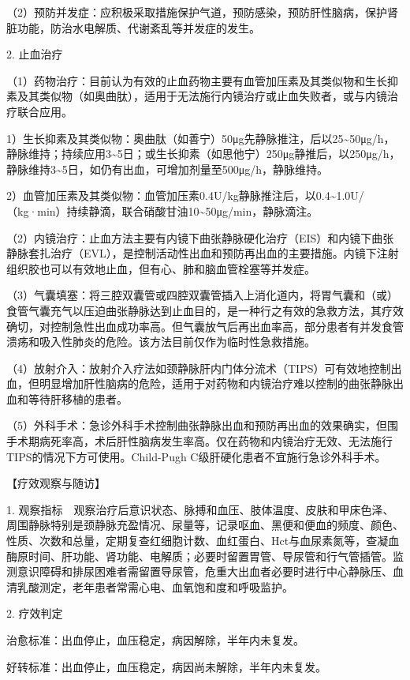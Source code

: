 （2）预防并发症：应积极采取措施保护气道，预防感染，预防肝性脑病，保护肾脏功能，防治水电解质、代谢紊乱等并发症的发生。

2. 止血治疗

（1）药物治疗：目前认为有效的止血药物主要有血管加压素及其类似物和生长抑素及其类似物（如奥曲肽），适用于无法施行内镜治疗或止血失败者，或与内镜治疗联合应用。

1）生长抑素及其类似物：奥曲肽（如善宁）50μg先静脉推注，后以25\textasciitilde{}50μg/h，静脉维持；持续应用3\textasciitilde{}5日；或生长抑素（如思他宁）250μg静推后，以250μg/h，静脉维持3\textasciitilde{}5日，如仍有出血，可增加剂量至500μg/h，静脉维持。

2）血管加压素及其类似物：血管加压素0.4U/kg静脉推注后，以0.4\textasciitilde{}1.0U/（kg·min）持续静滴，联合硝酸甘油10\textasciitilde{}50μg/min，静脉滴注。

（2）内镜治疗：止血方法主要有内镜下曲张静脉硬化治疗（EIS）和内镜下曲张静脉套扎治疗（EVL），是控制活动性出血和预防再出血的主要措施。内镜下注射组织胶也可以有效地止血，但有心、肺和脑血管栓塞等并发症。

（3）气囊填塞：将三腔双囊管或四腔双囊管插入上消化道内，将胃气囊和（或）食管气囊充气以压迫曲张静脉达到止血目的，是一种行之有效的急救方法，其疗效确切，对控制急性出血成功率高。但气囊放气后再出血率高，部分患者有并发食管溃疡和吸入性肺炎的危险。该方法目前仅作为临时性急救措施。

（4）放射介入：放射介入疗法如颈静脉肝内门体分流术（TIPS）可有效地控制出血，但明显增加肝性脑病的危险，适用于对药物和内镜治疗难以控制的曲张静脉出血和等待肝移植的患者。

（5）外科手术：急诊外科手术控制曲张静脉出血和预防再出血的效果确实，但围手术期病死率高，术后肝性脑病发生率高。仅在药物和内镜治疗无效、无法施行TIPS的情况下方可使用。Child-Pugh
C级肝硬化患者不宜施行急诊外科手术。

【疗效观察与随访】

1.
观察指标　观察治疗后意识状态、脉搏和血压、肢体温度、皮肤和甲床色泽、周围静脉特别是颈静脉充盈情况、尿量等，记录呕血、黑便和便血的频度、颜色、性质、次数和总量，定期复查红细胞计数、血红蛋白、Hct与血尿素氮等，查凝血酶原时间、肝功能、肾功能、电解质；必要时留置胃管、导尿管和行气管插管。监测意识障碍和排尿困难者需留置导尿管，危重大出血者必要时进行中心静脉压、血清乳酸测定，老年患者常需心电、血氧饱和度和呼吸监护。

2. 疗效判定

治愈标准：出血停止，血压稳定，病因解除，半年内未复发。

好转标准：出血停止，血压稳定，病因尚未解除，半年内未复发。

